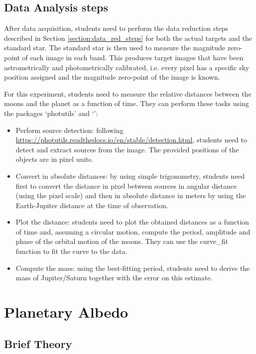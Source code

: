 \documentclass[a4paper, 11pt, fleqn]{memoir}
\begin{document}
\subsection{Data Analysis steps}

After data acquisition, students need to perform the data reduction steps described in Section \ref{section:data_red_steps} for both the actual targets and the standard star.
The standard star is then used to measure the magnitude zero-point of each image in each band.
This produces target images that have been astrometrically and photometrically calibrated, i.e. every pixel has a specific sky position assigned and the magnitude zero-point of the image is known.

For this experiment, students need to measure the relative distances between the moons and the planet as a function of time.
They can perform these tasks using the  packages `photutils' and `':
\begin{itemize}
    \item Perform source detection: following \url{https://photutils.readthedocs.io/en/stable/detection.html}, students need to detect and extract sources from the image.
          The provided positions of the objects are in pixel units.
    \item
          Convert in absolute distances: by using simple trigonometry, students need
          first to convert the distance in pixel between sources in angular distance
          (using the pixel scale) and then in absolute distance in meters by using the
          Earth-Jupiter distance at the time of observation.
    \item
          Plot the distance: students need to plot the obtained distances as a function
          of time and, assuming a circular motion, compute the period, amplitude and
          phase of the orbital motion of the moons.
          They can use the  curve\_fit function to fit the curve to the data.
    \item
          Compute the mass: using the best-fitting period, students need to derive the
          mass of Jupiter/Saturn together with the error on this estimate.
\end{itemize}

\section{Planetary Albedo}

\subsection{Brief Theory}
\label{subsection:albedo_theory}
\end{document}
